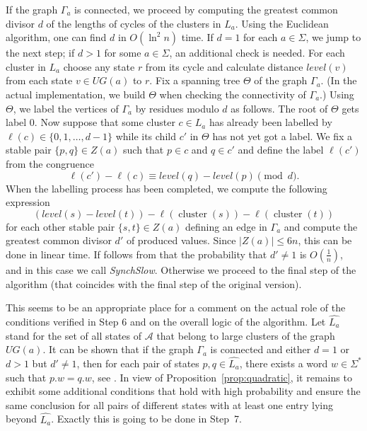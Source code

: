 \documentclass{jalc}
\DeclareMathOperator{\cluster}{cluster}
\begin{document}
If the graph $\Gamma_a$ is connected, we proceed by computing the greatest common divisor $d$ of the lengths of cycles of the clusters in $L_a$. Using the Euclidean algorithm, one can find $d$ in $O(\ln^2n)$ time. If $d=1$ for each $a\in\Sigma$, we jump to the next step; if $d>1$ for some $a\in\Sigma$, an additional check is needed. For each cluster in $L_a$ choose any state $r$ from its cycle and calculate distance $level(v)$ from each state $v \in U\!G(a)$ to $r$. Fix a spanning tree $\Theta$ of the graph $\Gamma_a$. (In the actual implementation, we build $\Theta$ when checking the connectivity of $\Gamma_a$.) Using $\Theta$, we label the vertices of $\Gamma_a$ by residues modulo $d$ as follows. The root of $\Theta$ gets label 0. Now suppose that some cluster $c\in L_a$ has already been labelled by $\ell(c)\in\{0,1,\dots,d-1\}$ while its child $c'$ in $\Theta$ has not yet got a label. We fix a stable pair $\{p,q\}\in Z(a)$ such that $p \in c$ and $q\in c'$ and define the label $\ell(c')$ from the congruence
\[
\ell(c')-\ell(c)\equiv level(q) - level(p)\pmod{d}.
\]
When the labelling process has been completed, we compute the following expression
\[
( level(s) - level(t)) - \ell(\cluster(s))-\ell(\cluster(t))
\]
for each other stable pair $\{s,t\}\in Z(a)$ defining an edge in $\Gamma_a$ and compute the greatest common divisor $d'$ of produced values. Since $|Z(a)|\le 6n$, this can be done in linear time. If follows from \cite[Lemma~4]{Berlinkov:preprint} that the probability that  $d'\neq1$ is $O(\frac1n)$, and in this case we call \emph{SynchSlow}. Otherwise we proceed
to the final step of the algorithm (that coincides with the final step of the original version).

\begin{remark}
\label{rem:logic}
This seems to be an appropriate place for a comment on the actual role of the conditions verified in Step 6 and on the overall logic of the algorithm. Let $\widehat{L_a}$ stand for the set of all states of $\mathcal{A}$ that belong to large clusters of the graph $U\!G(a)$.  It can be shown that if the graph $\Gamma_a$ is connected and either $d=1$ or $d>1$ but $d' \neq 1$, then for each pair of states $p,q\in\widehat{L_a}$, there exists a word $w\in\Sigma^*$ such that $p.w = q.w$, see \cite[Lemmas~3 and~4]{Berlinkov:preprint}. In view of Proposition~\ref{prop:quadratic}, it remains to exhibit some additional conditions that hold with high probability and ensure the same conclusion for all pairs of different states with at least one entry lying beyond $\widehat{L_a}$. Exactly this is going to be done in Step~7.
\end{remark}
\end{document}
